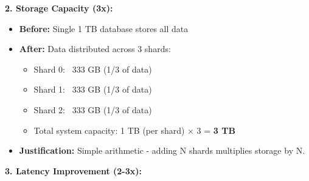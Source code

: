 \documentclass[12pt,a4paper]{article}
\begin{document}
\textbf{2. Storage Capacity (3x):}

\begin{itemize}
    \item \textbf{Before:} Single 1 TB database stores all data
    \item \textbf{After:} Data distributed across 3 shards:
    \begin{itemize}
        \item Shard 0: ~333 GB (1/3 of data)
        \item Shard 1: ~333 GB (1/3 of data)
        \item Shard 2: ~333 GB (1/3 of data)
        \item Total system capacity: 1 TB (per shard) × 3 = \textbf{3 TB}
    \end{itemize}
    \item \textbf{Justification:} Simple arithmetic - adding N shards multiplies storage by N.
\end{itemize}

\textbf{3. Latency Improvement (2-3x):}
\end{document}
